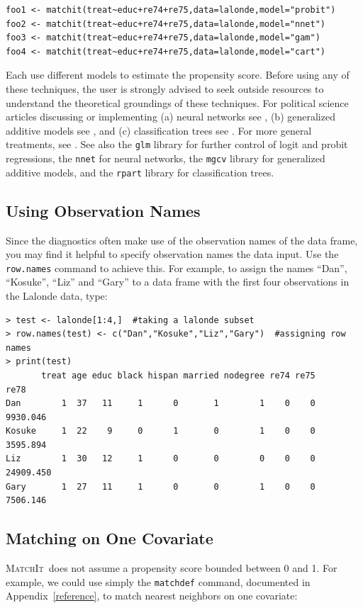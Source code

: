 \documentclass[oneside,letterpaper,titlepage]{article}
\newcommand{\MatchIt}{\textsc{MatchIt}}
\begin{document}
\begin{verbatim}
foo1 <- matchit(treat~educ+re74+re75,data=lalonde,model="probit")
foo2 <- matchit(treat~educ+re74+re75,data=lalonde,model="nnet")
foo3 <- matchit(treat~educ+re74+re75,data=lalonde,model="gam")
foo4 <- matchit(treat~educ+re74+re75,data=lalonde,model="cart")
\end{verbatim}

Each use different models to estimate the propensity score.  Before
using any of these techniques, the user is strongly advised to
seek outside resources to understand the theoretical groundings of
these techniques.  For political science articles discussing or
implementing (a) neural networks see
\citet{beck99,Zeng99,Zeng00,LagRus02}, (b) generalized
additive models see \citet{BecJac98}, and (c) classification trees
see \citet{RugKimMar03}.  For more general treatments,
see \citet{Bishop95,White92,BreFriOls84}. 
See also the \texttt{glm} library for further control of logit and
probit regressions, the \texttt{nnet} for neural networks, the
\texttt{mgcv} library for generalized additive models, and the
\texttt{rpart} library for classification trees.

\subsection{Using Observation Names}
\label{rnames}

Since the diagnostics often make use of the observation names of the
data frame, you may find it helpful to specify observation names the
data input.  Use the \texttt{row.names} command to achieve this.  For
example, to assign the names ``Dan'', ``Kosuke'', ``Liz'' and ``Gary''
to a data frame with the first four observations in the Lalonde data,
type: 

\begin{verbatim}
> test <- lalonde[1:4,]  #taking a lalonde subset
> row.names(test) <- c("Dan","Kosuke","Liz","Gary")  #assigning row names
> print(test)
       treat age educ black hispan married nodegree re74 re75      re78
Dan        1  37   11     1      0       1        1    0    0  9930.046
Kosuke     1  22    9     0      1       0        1    0    0  3595.894
Liz        1  30   12     1      0       0        0    0    0 24909.450
Gary       1  27   11     1      0       0        1    0    0  7506.146
\end{verbatim} 

\subsection{Matching on One Covariate}
\MatchIt\ does not assume a propensity score bounded between 0 and 1.
For example, we could use simply the \texttt{matchdef} command,
documented in Appendix~\ref{reference}, to match nearest neighbors on
one covariate:
\end{document}
